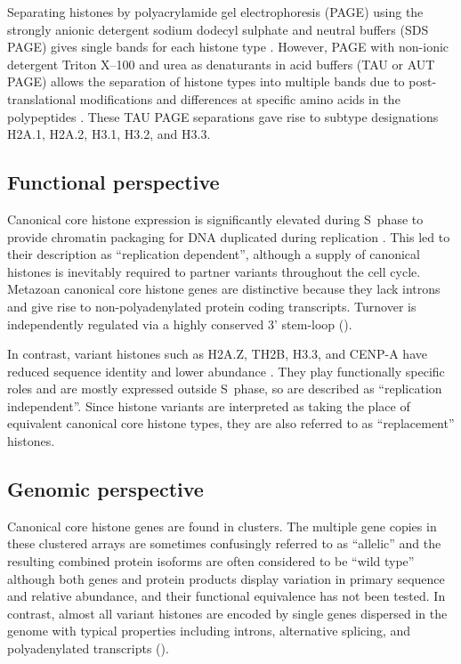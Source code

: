     Separating histones by polyacrylamide gel electrophoresis (PAGE)
    using the strongly anionic detergent sodium dodecyl sulphate and neutral buffers (SDS PAGE)
    gives single bands for each histone type \citep{ShechterHake2007}.
    However, PAGE with non-ionic detergent Triton X--100 and urea as denaturants
    in acid buffers (TAU or AUT PAGE) allows the separation
    of histone types into multiple bands
    due to post-translational modifications and differences at specific amino acids
    in the polypeptides \citep{Zweidler1977}.
    These TAU PAGE separations gave rise to subtype designations
    H2A.1, H2A.2, H3.1, H3.2, and H3.3.

  \subsection{Functional perspective}

    Canonical core histone expression
    is significantly elevated during S~phase to provide chromatin packaging
    for DNA duplicated during replication \citep{WuBonner1981}.
    This led to their description as ``replication dependent'',
    although a supply of canonical histones is inevitably required
    to partner variants throughout the cell cycle.
    Metazoan canonical core histone genes are distinctive
    because they lack introns and give rise to non-polyadenylated protein coding transcripts.
    Turnover is independently regulated via a highly
    conserved 3' stem-loop ().

    In contrast, variant histones such as H2A.Z, TH2B, H3.3, and CENP-A have
    reduced sequence identity and lower abundance \citep{TalbertHenikoff2010}.
    They play functionally specific roles and are mostly expressed outside S~phase,
    so are described as ``replication independent''.
    Since histone variants are interpreted as taking the place
    of equivalent canonical core histone types,
    they are also referred to as ``replacement'' histones.

  \subsection{Genomic perspective}

    Canonical core histone genes are found in \NumberOfClusters{} clusters.
    The multiple gene copies in these clustered arrays are
    sometimes confusingly referred to as ``allelic''
    and the resulting combined protein isoforms are often considered to be ``wild type''
    although both genes and protein products display
    variation in primary sequence and relative abundance,
    and their functional equivalence has not been tested.
    In contrast, almost all variant histones are encoded by single genes dispersed in the genome
    with typical properties including introns, alternative splicing,
    and polyadenylated transcripts ().


